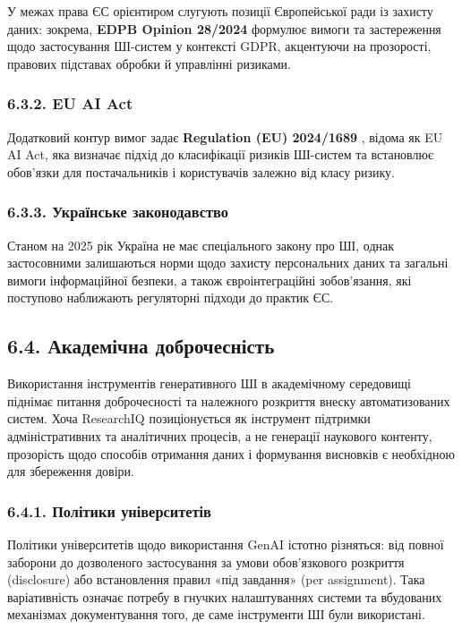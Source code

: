 У межах права ЄС орієнтиром слугують позиції Європейської ради із захисту даних: зокрема, \textbf{EDPB Opinion 28/2024} \cite{EDPB2024Opinion28} формулює вимоги та застереження щодо застосування ШІ-систем у контексті GDPR, акцентуючи на прозорості, правових підставах обробки й управлінні ризиками.

\subsubsection*{6.3.2. EU AI Act}

Додатковий контур вимог задає \textbf{Regulation (EU) 2024/1689} \cite{EU2024AIAct}, відома як EU AI Act, яка визначає підхід до класифікації ризиків ШІ-систем та встановлює обов'язки для постачальників і користувачів залежно від класу ризику.

\subsubsection*{6.3.3. Українське законодавство}

Станом на 2025 рік Україна не має спеціального закону про ШІ, однак застосовними залишаються норми щодо захисту персональних даних та загальні вимоги інформаційної безпеки, а також євроінтеграційні зобов'язання, які поступово наближають регуляторні підходи до практик ЄС.

\subsection*{6.4. Академічна доброчесність}

Використання інструментів генеративного ШІ в академічному середовищі піднімає питання доброчесності та належного розкриття внеску автоматизованих систем. Хоча ResearchIQ позиціонується як інструмент підтримки адміністративних та аналітичних процесів, а не генерації наукового контенту, прозорість щодо способів отримання даних і формування висновків є необхідною для збереження довіри.

\subsubsection*{6.4.1. Політики університетів}

Політики університетів щодо використання GenAI істотно різняться: від повної заборони до дозволеного застосування за умови обов'язкового розкриття (disclosure) або встановлення правил «під завдання» (per assignment). Така варіативність означає потребу в гнучких налаштуваннях системи та вбудованих механізмах документування того, де саме інструменти ШІ були використані.


